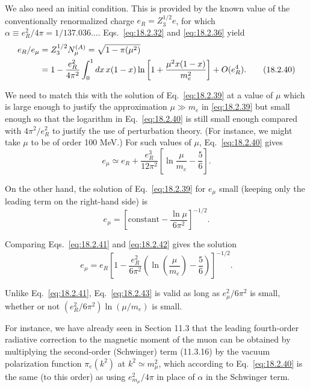 We also need an initial condition. This is provided by the known value of the
conventionally renormalized charge $e_R=Z_3^{1/2}e$, for which
$\alpha\equiv e_R^2/4\pi=1/137.036\ldots$. Eqs.~\eqref{eq:18.2.32} and
\eqref{eq:18.2.36} yield
\begin{align}
e_R/e_\mu
&=Z_3^{1/2}N_\mu^{(A)}=\sqrt{1-\pi(\mu^2)}\notag\\
&=1-\frac{e_R^2}{4\pi^2}\int_0^1dx\,x(1-x)
\ln\left[1+\frac{\mu^2x(1-x)}{m_e^2}\right]+O(e_R^4).
\tag{18.2.40}\label{eq:18.2.40}
\end{align}
\par\noindent
We need to match this with the solution of Eq.~\eqref{eq:18.2.39} at a value
of $\mu$ which is large enough to justify the approximation $\mu\gg m_e$ in
\eqref{eq:18.2.39} but small enough so that the logarithm in
Eq.~\eqref{eq:18.2.40} is still small enough compared with $4\pi^2/e_R^2$ to
justify the use of perturbation theory. (For instance, we might take $\mu$ to
be of order 100 MeV.) For such values of $\mu$, Eq.~\eqref{eq:18.2.40} gives
\begin{equation}
e_\mu\simeq e_R+\frac{e_R^3}{12\pi^2}
\left[\ln\frac{\mu}{m_e}-\frac{5}{6}\right].
\tag{18.2.41}\label{eq:18.2.41}
\end{equation}
\par\noindent
On the other hand, the solution of Eq.~\eqref{eq:18.2.39} for $e_\mu$ small
(keeping only the leading term on the right-hand side) is
\begin{equation}
e_\mu=\left[\text{constant}-\frac{\ln\mu}{6\pi^2}\right]^{-1/2}.
\tag{18.2.42}\label{eq:18.2.42}
\end{equation}
\par\noindent
Comparing Eqs.~\eqref{eq:18.2.41} and \eqref{eq:18.2.42} gives the solution
\begin{equation}
e_\mu=e_R\left[1-\frac{e_R^2}{6\pi^2}
\left(\ln\left(\frac{\mu}{m_e}\right)-\frac{5}{6}\right)\right]^{-1/2}.
\tag{18.2.43}\label{eq:18.2.43}
\end{equation}
\par\noindent
Unlike Eq.~\eqref{eq:18.2.41}, Eq.~\eqref{eq:18.2.43} is valid as long as
$e_\mu^2/6\pi^2$ is small, whether or not
$(e_R^2/6\pi^2)\allowbreak\ln(\mu/m_e)$ is small.

For instance, we have already seen in Section 11.3 that the leading
fourth-order radiative correction to the magnetic moment of the muon can be
obtained by multiplying the second-order (Schwinger) term (11.3.16)
by the vacuum polarization function $\pi_e(k^2)$ at $k^2\simeq m_\mu^2$,
which according to Eq.~\eqref{eq:18.2.40} is the same (to this order) as using
$e_{m_\mu}^2/4\pi$ in place of $\alpha$ in the Schwinger term.

